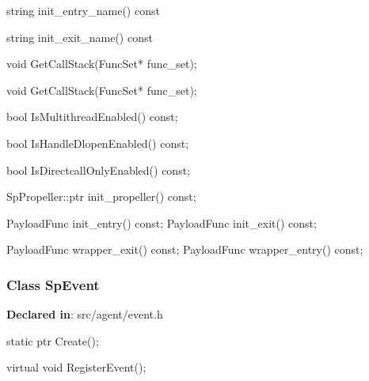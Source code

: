 \begin{apient}
string init_entry_name() const
\end{apient}
\apidesc{
}

\begin{apient}
string init_exit_name() const
\end{apient}
\apidesc{
}

\begin{apient}
void GetCallStack(FuncSet* func_set);
\end{apient}
\apidesc{
}

\begin{apient}
void GetCallStack(FuncSet* func_set);
\end{apient}
\apidesc{
}

\begin{apient}
bool IsMultithreadEnabled() const;
\end{apient}
\apidesc{
}

\begin{apient}
bool IsHandleDlopenEnabled() const;
\end{apient}
\apidesc{
}

\begin{apient}
bool IsDirectcallOnlyEnabled() const;
\end{apient}
\apidesc{
}

\begin{apient}
SpPropeller::ptr init_propeller() const;
\end{apient}
\apidesc{
}

\begin{apient}
PayloadFunc init_entry() const;
PayloadFunc init_exit() const;
\end{apient}
\apidesc{
}

\begin{apient}
PayloadFunc wrapper_exit() const;
PayloadFunc wrapper_entry() const;
\end{apient}
\apidesc{
}

\subsubsection{Class SpEvent}
\textbf{Declared in}: src/agent/event.h

\begin{apient}
static ptr Create();
\end{apient}

\begin{apient}
virtual void RegisterEvent();
\end{apient}
\apidesc{
}

